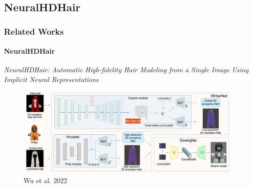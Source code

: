 \subsection{NeuralHDHair}
\begin{frame}\frametitle{Related Works}
    \framesubtitle{NeuralHDHair}

    \normalsize{\textcolor{myBlue}{\emph{NeuralHDHair: Automatic High-fidelity Hair Modeling from a Single Image Using Implicit Neural Representations}}}
    
    \begin{figure}[ht]
        \centering
        \includegraphics[width=0.8\linewidth]{assets/figures/baselines/NeuralHDHair.png}
        \caption{Wu et al. 2022\cite{wu2022neuralhdhair}}
        \label{fig:neuralhdhair}
    \end{figure}
\end{frame}

